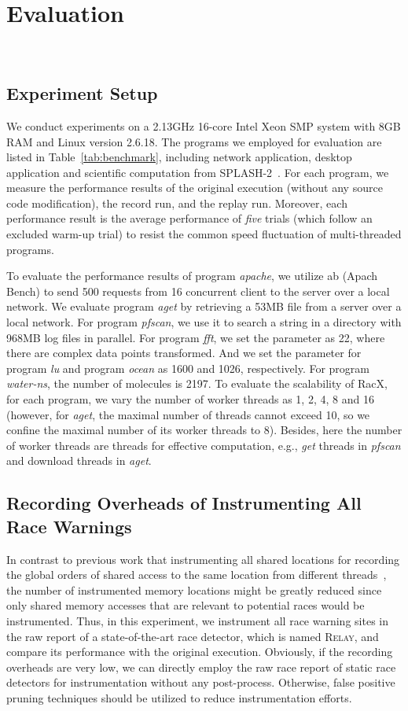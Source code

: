 \documentclass[10pt,onecolumn,letterpaper]{article}
\begin{document}
\section{Evaluation}~\label{sec:experiments}
\subsection{Experiment Setup}
We conduct experiments on a 2.13GHz 16-core Intel Xeon SMP system
with 8GB RAM and Linux version 2.6.18. The programs we employed for
evaluation are listed in Table~\ref{tab:benchmark}, including
network application, desktop application and scientific computation
from SPLASH-2~\cite{Woo95ISCA}. For each program, we measure the
performance results of the original execution (without any source
code modification), the record run, and the replay run. Moreover,
each performance result is the average performance of \emph{five}
trials (which follow an excluded warm-up trial) to resist the common
speed fluctuation of multi-threaded programs.

To evaluate the performance results of program \emph{apache}, we
utilize ab (Apach Bench) to send 500 requests from 16 concurrent
client to the server over a local network. We evaluate program
\emph{aget} by retrieving a 53MB file from a server over a local
network. For program \emph{pfscan}, we use it to search a string in
a directory with 968MB log files in parallel. For program \emph{fft}, we set the parameter  as 22, where there
are  complex data points transformed. And we set the parameter
 for program \emph{lu} and program \emph{ocean} as 1600 and 1026,
respectively. For program \emph{water-ns}, the number of molecules
is 2197. To evaluate the scalability of RacX, for each program, we
vary the number of worker threads as 1, 2, 4, 8 and 16 (however, for
\emph{aget}, the maximal number of threads cannot exceed 10, so we
confine the maximal number of its worker threads to 8). Besides,
here the number of worker threads are threads for effective
computation, e.g., \emph{get} threads in \emph{pfscan} and download
threads in \emph{aget}.

\subsection{Recording Overheads of Instrumenting All Race Warnings}
In contrast to previous work that instrumenting all shared locations
for recording the global orders of shared access to the same
location from different
threads~\cite{Narayanasamy06SIGMETRICS,Patil10CGO}, the number of
instrumented memory locations might be greatly reduced since only
shared memory accesses that are relevant to potential races would be
instrumented. Thus, in this experiment, we instrument all race
warning sites in the raw report of a state-of-the-art race detector,
which is named R\textsc{elay}, and compare its performance with the
original execution. Obviously, if the recording overheads are very
low, we can directly employ the raw race report of static race
detectors for instrumentation without any post-process. Otherwise,
false positive pruning techniques should be utilized to reduce
instrumentation efforts.
\end{document}
